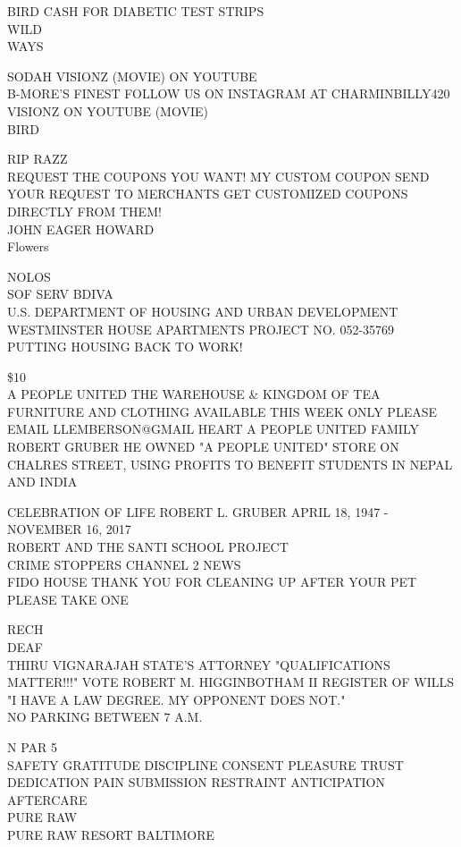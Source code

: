 \documentclass[10pt,letterpaper]{article}
\begin{document}
BIRD CASH FOR DIABETIC TEST STRIPS\\
WILD\\
WAYS

SODAH VISIONZ (MOVIE) ON YOUTUBE\\
B{-}MORE'S FINEST FOLLOW US ON INSTAGRAM AT CHARMINBILLY420\\
VISIONZ ON YOUTUBE (MOVIE)\\
BIRD

RIP RAZZ\\
REQUEST THE COUPONS YOU WANT!  MY CUSTOM COUPON SEND YOUR REQUEST TO MERCHANTS GET CUSTOMIZED COUPONS DIRECTLY FROM THEM!\\
JOHN EAGER HOWARD\\
Flowers

NOLOS\\
SOF SERV BDIVA\\
U.S. DEPARTMENT OF HOUSING AND URBAN DEVELOPMENT WESTMINSTER HOUSE APARTMENTS PROJECT NO. 052{-}35769\\
PUTTING HOUSING BACK TO WORK!

\$10\\
A PEOPLE UNITED THE WAREHOUSE \& KINGDOM OF TEA\\
FURNITURE AND CLOTHING AVAILABLE THIS WEEK ONLY PLEASE EMAIL LLEMBERSON@GMAIL HEART A PEOPLE UNITED FAMILY\\
ROBERT GRUBER HE OWNED "A PEOPLE UNITED" STORE ON CHALRES STREET, USING PROFITS TO BENEFIT STUDENTS IN NEPAL AND INDIA

CELEBRATION OF LIFE ROBERT L. GRUBER APRIL 18, 1947 {-} NOVEMBER 16, 2017\\
ROBERT AND THE SANTI SCHOOL PROJECT\\
CRIME STOPPERS CHANNEL 2 NEWS\\
FIDO HOUSE THANK YOU FOR CLEANING UP AFTER YOUR PET PLEASE TAKE ONE

RECH\\
DEAF\\
THIRU VIGNARAJAH STATE'S ATTORNEY "QUALIFICATIONS MATTER!!!" VOTE ROBERT M. HIGGINBOTHAM II REGISTER OF WILLS "I HAVE A LAW DEGREE.  MY OPPONENT DOES NOT."\\
NO PARKING BETWEEN 7 A.M.

N PAR 5\\
SAFETY GRATITUDE DISCIPLINE CONSENT PLEASURE TRUST DEDICATION PAIN SUBMISSION RESTRAINT ANTICIPATION AFTERCARE\\
PURE RAW\\
PURE RAW RESORT BALTIMORE
\end{document}
